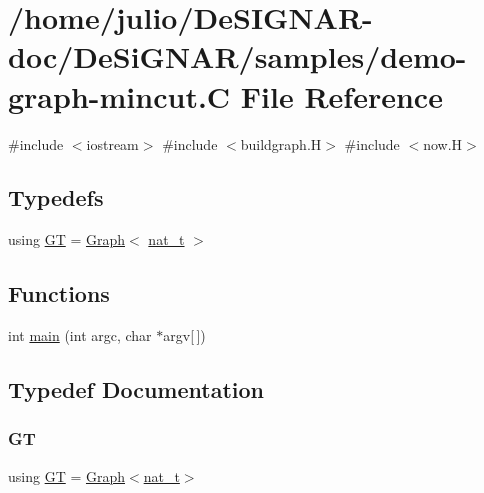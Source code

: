\hypertarget{demo-graph-mincut_8_c}{}\section{/home/julio/\+De\+S\+I\+G\+N\+A\+R-\/doc/\+De\+Si\+G\+N\+A\+R/samples/demo-\/graph-\/mincut.C File Reference}
\label{demo-graph-mincut_8_c}
{\ttfamily \#include $<$iostream$>$}\newline
{\ttfamily \#include $<$buildgraph.\+H$>$}\newline
{\ttfamily \#include $<$now.\+H$>$}\newline
\subsection*{Typedefs}
\begin{DoxyCompactItemize}
\item 
using \hyperlink{demo-graph-mincut_8_c_a3001c40d2c31ca87ed96cd7d1334a55e}{GT} = \hyperlink{class_designar_1_1_graph}{Graph}$<$ \hyperlink{namespace_designar_aa72662848b9f4815e7bf31a7cf3e33d1}{nat\+\_\+t} $>$
\end{DoxyCompactItemize}
\subsection*{Functions}
\begin{DoxyCompactItemize}
\item 
int \hyperlink{demo-graph-mincut_8_c_a0ddf1224851353fc92bfbff6f499fa97}{main} (int argc, char $\ast$argv\mbox{[}$\,$\mbox{]})
\end{DoxyCompactItemize}


\subsection{Typedef Documentation}
\mbox{\label{demo-graph-mincut_8_c_a3001c40d2c31ca87ed96cd7d1334a55e}} 
\subsubsection{\texorpdfstring{GT}{GT}}
{\footnotesize\ttfamily using \hyperlink{demo-buildgraph_8_c_a3001c40d2c31ca87ed96cd7d1334a55e}{GT} =  \hyperlink{class_designar_1_1_graph}{Graph}$<$\hyperlink{namespace_designar_aa72662848b9f4815e7bf31a7cf3e33d1}{nat\+\_\+t}$>$}



